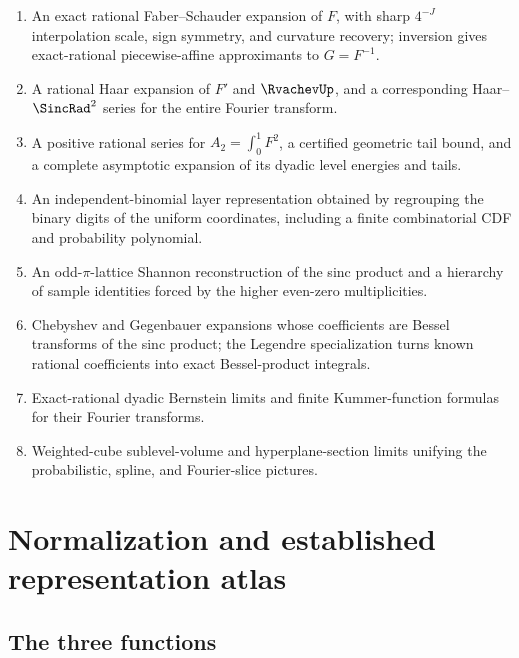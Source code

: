 \documentclass[11pt]{article}
\theoremstyle{definition}
\theoremstyle{remark}
\begin{document}
\begin{enumerate}
\item An exact rational Faber--Schauder expansion of $F$, with sharp
      $4^{-J}$ interpolation scale, sign symmetry, and curvature recovery;
      inversion gives exact-rational piecewise-affine approximants to $G=F^{-1}$.
\item A rational Haar expansion of $F'$ and $\RvachevUp$, and a corresponding
      Haar--$\SincRad^2$ series for the entire Fourier transform.
\item A positive rational series for $A_2=\int_0^1F^2$, a certified geometric
      tail bound, and a complete asymptotic expansion of its dyadic level
      energies and tails.
\item An independent-binomial layer representation obtained by regrouping
      the binary digits of the uniform coordinates, including a finite
      combinatorial CDF and probability polynomial.
\item An odd-$\pi$-lattice Shannon reconstruction of the sinc product and a
      hierarchy of sample identities forced by the higher even-zero
      multiplicities.
\item Chebyshev and Gegenbauer expansions whose coefficients are
      Bessel transforms of the sinc product; the Legendre specialization
      turns known rational coefficients into exact Bessel-product integrals.
\item Exact-rational dyadic Bernstein limits and finite Kummer-function
      formulas for their Fourier transforms.
\item Weighted-cube sublevel-volume and hyperplane-section limits unifying
      the probabilistic, spline, and Fourier-slice pictures.
\end{enumerate}

\section{Normalization and established representation atlas}
\label{p8:sec:atlas}

\subsection{The three functions}
\end{document}

